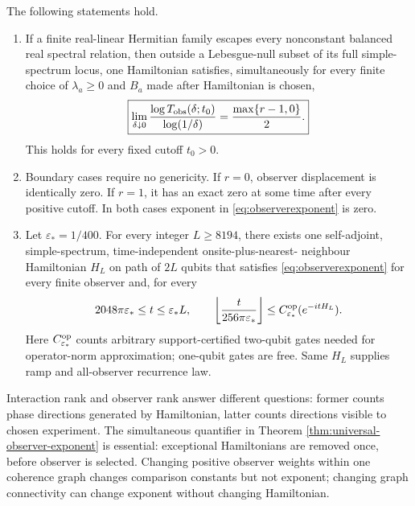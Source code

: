 \begin{theorem}
\label{thm:universal-observer-exponent}
The following statements hold.
\begin{enumerate}[leftmargin=1.55em]
\item If a finite real-linear Hermitian family escapes every nonconstant
balanced real spectral relation, then outside a Lebesgue-null subset of its
full simple-spectrum locus, one Hamiltonian satisfies, simultaneously for
every finite choice of $\lambda_a\ge0$ and $B_a$ made after Hamiltonian is
chosen,
\begin{equation}
 \boxed{\displaystyle
 \lim_{\delta\downarrow0}
 \frac{\log T_{\rm obs}(\delta;t_0)}{\log(1/\delta)}
 =\frac{\max\{r-1,0\}}2.}                            \label{eq:observerexponent}
\end{equation}
This holds for every fixed cutoff $t_0>0$.
\item Boundary cases require no genericity.  If $r=0$, observer displacement
is identically zero.  If $r=1$, it has an exact zero at some time after every
positive cutoff.  In both cases exponent in \eqref{eq:observerexponent} is
zero.
\item Let $\varepsilon_*=1/400$.  For every integer $L\ge8194$, there exists
one self-adjoint, simple-spectrum, time-independent onsite-plus-nearest-
neighbour Hamiltonian $H_L$ on path of $2L$ qubits that satisfies
\eqref{eq:observerexponent} for every finite observer and, for every
\begin{equation}
 2048\pi\varepsilon_*\le t\le\varepsilon_*L,
 \qquad
 \left\lfloor\frac{t}{256\pi\varepsilon_*}\right\rfloor
 \le C^{\rm op}_{\varepsilon_*}(e^{-itH_L}).          \label{eq:observerramp}
\end{equation}
Here $C^{\rm op}_{\varepsilon_*}$ counts arbitrary support-certified
two-qubit gates needed for operator-norm approximation; one-qubit gates are
free.  Same $H_L$ supplies ramp and all-observer recurrence law.
\end{enumerate}
\end{theorem}

Interaction rank and observer rank answer different questions: former counts
phase directions generated by Hamiltonian, latter counts directions visible
to chosen experiment.  The simultaneous quantifier in Theorem
\ref{thm:universal-observer-exponent} is essential: exceptional Hamiltonians
are removed once, before observer is selected.  Changing positive observer
weights within one coherence graph changes comparison constants but not
exponent; changing graph connectivity can change exponent without changing
Hamiltonian.

